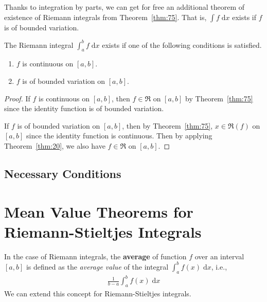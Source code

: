 \documentclass[thmcnt=section, 12pt]{my-elegantbook}
\begin{document}

Thanks to integration by parts,
we can get for free 
an additional theorem of existence
of Riemann integrals from Theorem~\ref{thm:75}.
That is, $ \int f \; \mathrm{d} x $ exists
if $ f $ is of bounded variation.

\begin{theorem} \label{thm:76}
	The Riemann integral $ \int_a^b f \; \mathrm{d} x $
	exists if one of the following conditions is satisfied.
	\begin{enumerate}
		\item $ f $ is continuous on $ [a, b] $.
		\item $ f $ is of bounded variation on $ [a, b] $.
	\end{enumerate}
\end{theorem}

\begin{proof}
	If $ f $ is continuous on $ [a, b] $, then 
	$ f \in \mathfrak{R} $ on $ [a, b] $ by Theorem~\ref{thm:75}
	since the identity function is of bounded variation.

	If $ f $ is of bounded variation on $ [a, b] $,
	then by Theorem~\ref{thm:75},
	$ x \in \mathfrak{R}(f) $ on $ [a, b] $
	since the identity function is continuous.
	Then by applying Theorem~\ref{thm:20}, 
	we also have $ f \in \mathfrak{R} $ on $ [a, b] $.
\end{proof}


\subsection{Necessary Conditions}


\section{Mean Value Theorems for Riemann-Stieltjes Integrals}


In the case of Riemann integrals, 
the \textbf{average}
of function $f$ over an interval $[a, b]$ is defined as 
the \textit{average value} of the integral 
$\int_a^b f(x) \; \mathrm{d} x$, i.e., 
\begin{align*}
	\frac{1}{b - a} \int_a^b f(x) \; \mathrm{d} x
\end{align*}
We can extend this concept for Riemann-Stieltjes integrals.
\end{document}
